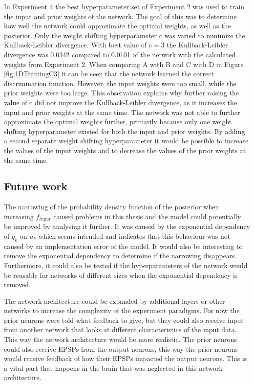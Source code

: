 In Experiment 4 the best hyperparameter set of Experiment 2 was used to train the input and prior weights of the network. The goal of this was to determine how well the network could approximate the optimal weights, as well as the posterior. Only the weight shifting hyperparameter c was varied to minimize the Kullback-Leibler divergence. With best value of $c = 3$ the Kullback-Leibler divergence was 0.0342 compared to 0.0101 of the network with the calculated weights from Experiment 2. When comparing A with B and C with D in Figure \ref{fig:1DTrainingC3} it can be seen that the network learned the correct discrimination function. However, the input weights were too small, while the prior weights were too large. This observation explains why further raising the value of c did not improve the Kullback-Leibler divergence, as it increases the input and prior weights at the same time. The network was not able to further approximate the optimal weights further, primarily because only one weight shifting hyperparameter existed for both the input and prior weights. By adding a second separate weight shifting hyperparameter it would be possible to increase the values of the input weights and to decrease the values of the prior weights at the same time.

\subsection{Future work}

The narrowing of the probability density function of the posterior when increasing $f_{input}$ caused problems in this thesis and the model could potentially be improved by analysing it further. It was caused by the exponential dependency of $q_k$ on $u_k$ which seems intended and indicates that this behaviour was not caused by an implementation error of the model. It would also be interesting to remove the exponential dependency to determine if the narrowing disappears. Furthermore, it could also be tested if the hyperparameters of the network would be reusable for networks of different sizes when the exponential dependency is removed.

The network architecture could be expanded by additional layers or other networks to increase the complexity of the experiment paradigms. For now the prior neurons were told what feedback to give, but they could also receive input from another network that looks at different characteristics of the input data. This way the network architecture would be more realistic. The prior neurons could also receive EPSPs from the output neurons, this way the prior neurons would receive feedback of how their EPSPs impacted the output neurons. This is a vital part that happens in the brain that was neglected in this network architecture.

